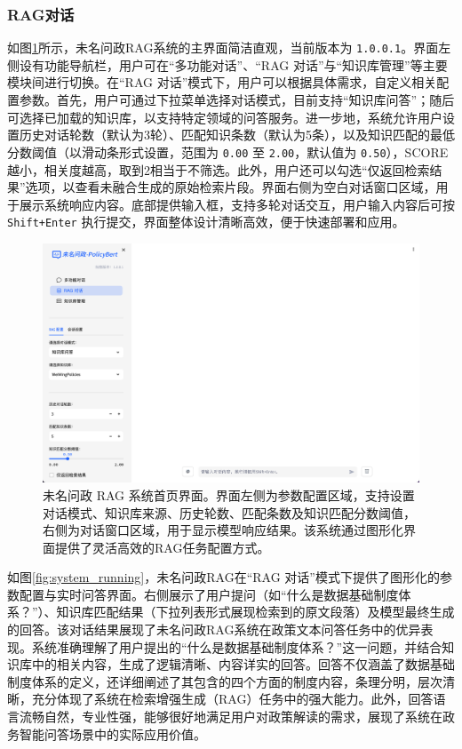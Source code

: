 \documentclass[12pt, a4paper]{ctexart}
\begin{document}
\subsubsection{RAG对话}
如图\ref{fig:home_page}所示，未名问政RAG系统的主界面简洁直观，当前版本为 \texttt{1.0.0.1}。界面左侧设有功能导航栏，用户可在“多功能对话”、“RAG 对话”与“知识库管理”等主要模块间进行切换。在“RAG 对话”模式下，用户可以根据具体需求，自定义相关配置参数。首先，用户可通过下拉菜单选择对话模式，目前支持“知识库问答”；随后可选择已加载的知识库，以支持特定领域的问答服务。进一步地，系统允许用户设置历史对话轮数（默认为3轮）、匹配知识条数（默认为5条），以及知识匹配的最低分数阈值（以滑动条形式设置，范围为 \texttt{0.00} 至 \texttt{2.00}，默认值为 \texttt{0.50}），SCORE越小，相关度越高，取到2相当于不筛选。此外，用户还可以勾选“仅返回检索结果”选项，以查看未融合生成的原始检索片段。界面右侧为空白对话窗口区域，用于展示系统响应内容。底部提供输入框，支持多轮对话交互，用户输入内容后可按 \texttt{Shift+Enter} 执行提交，界面整体设计清晰高效，便于快速部署和应用。
\begin{figure}[H]
    \centering
    \includegraphics[width=1\textwidth]{./images/home_page.png}
    \caption{未名问政 RAG 系统首页界面。界面左侧为参数配置区域，支持设置对话模式、知识库来源、历史轮数、匹配条数及知识匹配分数阈值，右侧为对话窗口区域，用于显示模型响应结果。该系统通过图形化界面提供了灵活高效的RAG任务配置方式。}
    \label{fig:home_page}
\end{figure}

如图\ref{fig:system_running}，未名问政RAG在“RAG 对话”模式下提供了图形化的参数配置与实时问答界面。右侧展示了用户提问（如“什么是数据基础制度体系？”）、知识库匹配结果（下拉列表形式展现检索到的原文段落）及模型最终生成的回答。该对话结果展现了未名问政RAG系统在政策文本问答任务中的优异表现。系统准确理解了用户提出的“什么是数据基础制度体系？”这一问题，并结合知识库中的相关内容，生成了逻辑清晰、内容详实的回答。回答不仅涵盖了数据基础制度体系的定义，还详细阐述了其包含的四个方面的制度内容，条理分明，层次清晰，充分体现了系统在检索增强生成（RAG）任务中的强大能力。此外，回答语言流畅自然，专业性强，能够很好地满足用户对政策解读的需求，展现了系统在政务智能问答场景中的实际应用价值。
\end{document}
